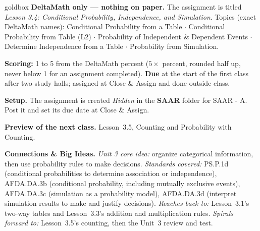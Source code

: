 \documentclass[10pt]{article}
\begin{document}
\boxguard
\begin{skillbox}{goldbox}
\textbf{DeltaMath only --- nothing on paper.} The assignment is titled \emph{Lesson 3.4: Conditional
Probability, Independence, and Simulation}. Topics (exact DeltaMath names): Conditional Probability
from a Table $\cdot$ Conditional Probability from Table (L2) $\cdot$ Probability of Independent \&
Dependent Events $\cdot$ Determine Independence from a Table $\cdot$ Probability from Simulation.

\textbf{Scoring:} 1 to 5 from the DeltaMath percent ($5 \times$ percent, rounded half up, never
below 1 for an assignment completed). \textbf{Due} at the start of the first class after two study
halls; assigned at Close \& Assign and done outside class.

\textbf{Setup.} The assignment is created \emph{Hidden} in the \textbf{SAAR} folder for SAAR - A.
Post it and set its due date at Close \& Assign.

\textbf{Preview of the next class.} Lesson~3.5, Counting and Probability with Counting.

\textbf{Connections \& Big Ideas.} \textit{Unit 3 core idea:} organize categorical information, then
use probability rules to make decisions. \textit{Standards covered:} PS.P.1d (conditional
probabilities to determine association or independence), AFDA.DA.3b (conditional probability,
including mutually exclusive events), AFDA.DA.3c (simulation as a probability model), AFDA.DA.3d
(interpret simulation results to make and justify decisions). \textit{Reaches back to:} Lesson~3.1's
two-way tables and Lesson~3.3's addition and multiplication rules. \textit{Spirals forward to:}
Lesson~3.5's counting, then the Unit~3 review and test.
\end{skillbox}
\end{document}
